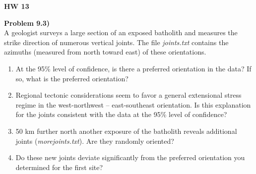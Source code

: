 \documentclass[10pt,letter]{report}
\renewcommand{\bf}{\textbf}
\begin{document}
	\begin{center} \bf{HW 13} \end{center}
		
	\bf{Problem 9.3)} \\

	A geologist surveys a large section of an exposed batholith and measures the strike 
	direction of numerous vertical joints.  The file \emph{joints.txt} contains the azimuths (measured from north toward east) 
	of these orientations.

	\begin{enumerate}[label=\alph*)]
	\item At the 95\% level of confidence, is there a preferred orientation in the data?  If so, what is the 
	preferred orientation?

	\item Regional tectonic considerations seem to favor a general extensional stress regime in the west-northwest
	-- east-southeast orientation.  Is this explanation for the joints consistent with the data 
	at the 95\% level of confidence?

	\item 50 km further north another exposure of the batholith reveals additional joints (\emph{morejoints.txt}).  Are 
	they randomly oriented?

	\item Do these new joints deviate significantly from the preferred orientation you determined for the first site?
	\end{enumerate}
\end{document}
